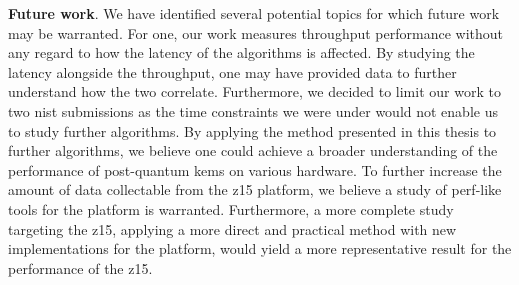 \noindent\textbf{Future work}. We have identified several potential topics for which future work may be warranted. For one, our work measures throughput performance without any regard to how the latency of the algorithms is affected. By studying the latency alongside the throughput, one may have provided data to further understand how the two correlate. Furthermore, we decided to limit our work to two \gls{nist} submissions as the time constraints we were under would not enable us to study further algorithms. By applying the method presented in this thesis to further algorithms, we believe one could achieve a broader understanding of the performance of \gls{post-quantum} \glspl{kem} on various hardware. To further increase the amount of data collectable from the \gls{z15} platform, we believe a study of perf-like tools for the platform is warranted. Furthermore, a more complete study targeting the \gls{z15}, applying a more direct and practical method with new implementations for the platform, would yield a more representative result for the performance of the \gls{z15}.